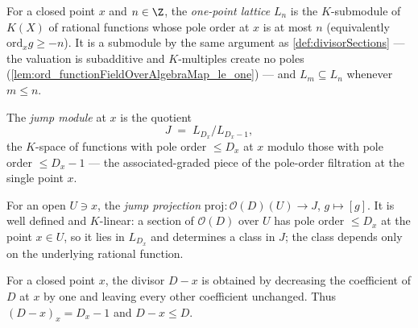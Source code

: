 \begin{definition}
  \label{def:pointLattice}
  \leanok
  For a closed point \(x\) and \(n \in \Z\), the \emph{one-point lattice} \(L_n\) is the
  \(K\)-submodule of \(K(X)\) of rational functions whose pole order at \(x\) is at most \(n\)
  (equivalently \(\mathrm{ord}_x g \ge -n\)). It is a submodule by the same argument as
  \ref{def:divisorSections} --- the valuation is subadditive and \(K\)-multiples create no poles
  (\ref{lem:ord_functionFieldOverAlgebraMap_le_one}) --- and \(L_m \subseteq L_n\) whenever
  \(m \le n\).
\end{definition}

\begin{definition}
  \label{def:jumpModule}
  \leanok
  The \emph{jump module} at \(x\) is the quotient
  \[
    J \;=\; L_{D_x} \big/ L_{D_x - 1},
  \]
  the \(K\)-space of functions with pole order \(\le D_x\) at \(x\) modulo those with pole order
  \(\le D_x - 1\) --- the associated-graded piece of the pole-order filtration at the single point
  \(x\).
\end{definition}

\begin{definition}
  \label{def:jumpProj}
  \leanok
  For an open \(U \ni x\), the \emph{jump projection} \(\mathrm{proj} : \mathcal O(D)(U) \to J\),
  \(g \mapsto [g]\). It is well defined and \(K\)-linear: a section of \(\mathcal O(D)\) over \(U\)
  has pole order \(\le D_x\) at the point \(x \in U\), so it lies in \(L_{D_x}\) and determines a
  class in \(J\); the class depends only on the underlying rational function.
\end{definition}

\begin{definition}
  \label{def:devissageDivisor}
  \leanok
  For a closed point \(x\), the divisor \(D - x\) is obtained by decreasing the coefficient of \(D\)
  at \(x\) by one and leaving every other coefficient unchanged. Thus \((D-x)_x = D_x - 1\) and
  \(D - x \le D\).
\end{definition}


